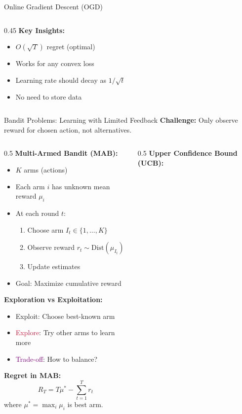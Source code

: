 \begin{frame}[fragile]{Online Gradient Descent (OGD)}
\begin{columns}
\begin{column}{0.45\textwidth}
\textbf{Key Insights:}
\begin{itemize}
\item $O(\sqrt{T})$ regret (optimal)
\item Works for any convex loss
\item Learning rate should decay as $1/\sqrt{t}$
\item No need to store data
\end{itemize}
\end{column}
\end{columns}
\end{frame}

\begin{frame}{Bandit Problems: Learning with Limited Feedback}
\textbf{Challenge:} Only observe reward for chosen action, not alternatives.

\begin{columns}
\begin{column}{0.5\textwidth}
\textbf{Multi-Armed Bandit (MAB):}

\begin{itemize}
\item $K$ arms (actions)
\item Each arm $i$ has unknown mean reward $\mu_i$
\item At each round $t$:
  \begin{enumerate}
  \item Choose arm $I_t \in \{1, \ldots, K\}$
  \item Observe reward $r_t \sim \text{Dist}(\mu_{I_t})$
  \item Update estimates
  \end{enumerate}
\item Goal: Maximize cumulative reward
\end{itemize}

\vspace{0.3cm}
\textbf{Exploration vs Exploitation:}
\begin{itemize}
\item \textcolor{forest}{Exploit}: Choose best-known arm
\item \textcolor{crimson}{Explore}: Try other arms to learn more
\item \textcolor{purple}{Trade-off}: How to balance?
\end{itemize}

\vspace{0.3cm}
\textbf{Regret in MAB:}
\[R_T = T \mu^* - \sum_{t=1}^T r_t\]
where $\mu^* = \max_i \mu_i$ is best arm.
\end{column}
\begin{column}{0.5\textwidth}
\textbf{Upper Confidence Bound (UCB):}


\end{column}
\end{columns}
\end{frame}
